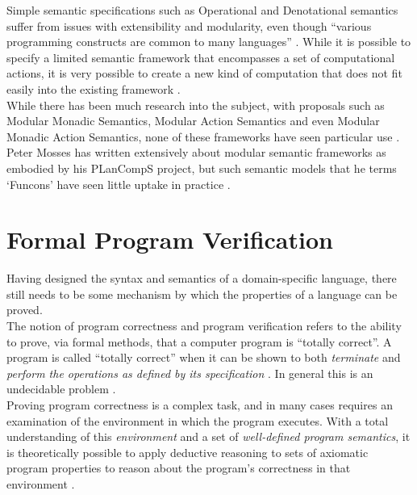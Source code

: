 \documentclass[a4paper,11pt]{report}
\begin{document}
Simple semantic specifications such as Operational and Denotational semantics suffer from issues with extensibility and modularity, even though ``various programming constructs are common to many languages'' \citep{Churchill:2014:RCS:2577080.2577099,Zhang:2004:SSD:981009.981013,mosses2001varieties,mosses2004modular}. 
While it is possible to specify a limited semantic framework that encompasses a set of computational actions, it is very possible to create a new kind of computation that does not fit easily into the existing framework \citep{wansbrough1997modular}. \\

While there has been much research into the subject, with proposals such as Modular Monadic Semantics, Modular Action Semantics and even Modular Monadic Action Semantics, none of these frameworks have seen particular use \citep{wansbrough1997modular,mosses1992action,Zhang:2004:SSD:981009.981013,Mosses:2009:CS:1596486.1596489,mosses2001varieties}.
Peter Mosses has written extensively about modular semantic frameworks as embodied by his PLanCompS project, but such semantic models that he terms `Funcons' have seen little uptake in practice \citep{Mosses:2009:CS:1596486.1596489,Churchill:2014:RCS:2577080.2577099,Binsbergen:2016:TSC:2892664.2893464}.




\section{Formal Program Verification} %
\label{sec:formal_program_verification}
Having designed the syntax and semantics of a domain-specific language, there still needs to be some mechanism by which the properties of a language can be proved. \\

The notion of program correctness and program verification refers to the ability to prove, via formal methods, that a computer program is ``totally correct''.
A program is called ``totally correct'' when it can be shown to both \textit{terminate} and \textit{perform the operations as defined by its specification} \citep{manna1974axiomatic}.
In general this is an undecidable problem \citep{walther1994proving}.\\

Proving program correctness is a complex task, and in many cases requires an examination of the environment in which the program executes.
With a total understanding of this \textit{environment} and a set of \textit{well-defined program semantics}, it is theoretically possible to apply deductive reasoning to sets of axiomatic program properties to reason about the program's correctness in that environment \citep{Hoare:1969:ABC:363235.363259}.\\
\end{document}
